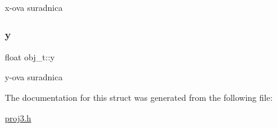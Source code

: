 x-\/ova suradnica \mbox{\label{structobj__t_a1101f5b48ee96a247c71aa8a33feb2bb}} 
\subsubsection{\texorpdfstring{y}{y}}
{\footnotesize\ttfamily float obj\+\_\+t\+::y}

y-\/ova suradnica 

The documentation for this struct was generated from the following file\+:\begin{DoxyCompactItemize}
\item 
\hyperlink{proj3_8h}{proj3.\+h}\end{DoxyCompactItemize}
